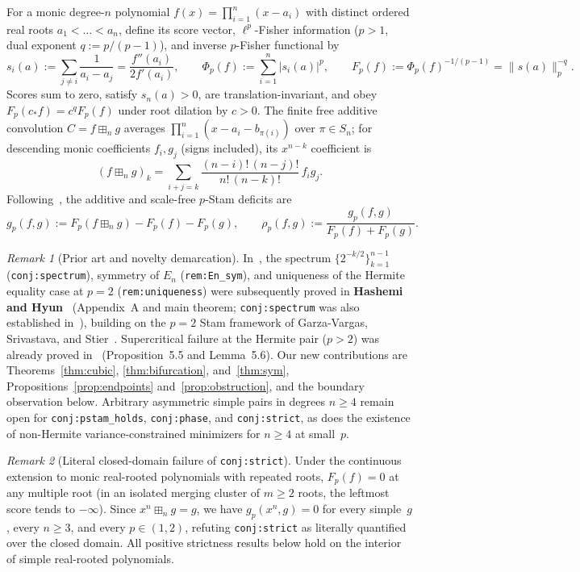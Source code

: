\documentclass[11pt]{article}
\theoremstyle{plain}
\theoremstyle{definition}
\theoremstyle{remark}
\newtheorem{remark}{Remark}
\begin{document}
For a monic degree-$n$ polynomial $f(x) = \prod_{i=1}^n (x - a_i)$ with distinct ordered real roots $a_1 < \dots < a_n$, define its score vector, $\ell^p$-Fisher information ($p > 1$, dual exponent $q := p/(p-1)$), and inverse $p$-Fisher functional by
\[
s_i(a) := \sum_{j \neq i} \frac{1}{a_i - a_j} = \frac{f''(a_i)}{2 f'(a_i)},
\qquad
\Phi_p(f) := \sum_{i=1}^n |s_i(a)|^p,
\qquad
F_p(f) := \Phi_p(f)^{-1/(p-1)} = \|s(a)\|_p^{-q}.
\]
Scores sum to zero, satisfy $s_n(a) > 0$, are translation-invariant, and obey $F_p(c_* f) = c^q F_p(f)$ under root dilation by $c > 0$. The finite free additive convolution $C = f \boxplus_n g$ averages $\prod_{i=1}^n (x - a_i - b_{\pi(i)})$ over $\pi \in S_n$; for descending monic coefficients $f_i, g_j$ (signs included), its $x^{n-k}$ coefficient is
\[
(f \boxplus_n g)_k = \sum_{i+j=k} \frac{(n-i)!\,(n-j)!}{n!\,(n-k)!}\, f_i g_j.
\]
Following~\cite{Hashemi2026}, the additive and scale-free $p$-Stam deficits are
\[
g_p(f,g) := F_p(f \boxplus_n g) - F_p(f) - F_p(g),
\qquad
\rho_p(f,g) := \frac{g_p(f,g)}{F_p(f) + F_p(g)}.
\]

\begin{remark}[Prior art and novelty demarcation]
In~\cite{Hashemi2026}, the spectrum $\{2^{-k/2}\}_{k=1}^{n-1}$ (\texttt{conj:spectrum}), symmetry of $E_n$ (\texttt{rem:En\_sym}), and uniqueness of the Hermite equality case at $p = 2$ (\texttt{rem:uniqueness}) were subsequently proved in \textbf{Hashemi and Hyun}~\cite{HashemiHyun2026} (Appendix~A and main theorem; \texttt{conj:spectrum} was also established in~\cite{MachinaSpec}), building on the $p = 2$ Stam framework of Garza-Vargas, Srivastava, and Stier~\cite{GVS2026}. Supercritical failure at the Hermite pair ($p > 2$) was already proved in~\cite{Hashemi2026} (Proposition~5.5 and Lemma~5.6). Our new contributions are Theorems~\ref{thm:cubic}, \ref{thm:bifurcation}, and~\ref{thm:sym}, Propositions~\ref{prop:endpoints} and~\ref{prop:obstruction}, and the boundary observation below. Arbitrary asymmetric simple pairs in degrees $n \ge 4$ remain open for \texttt{conj:pstam\_holds}, \texttt{conj:phase}, and \texttt{conj:strict}, as does the existence of non-Hermite variance-constrained minimizers for $n \ge 4$ at small~$p$.
\end{remark}

\begin{remark}[Literal closed-domain failure of \texttt{conj:strict}]
Under the continuous extension to monic real-rooted polynomials with repeated roots, $F_p(f) = 0$ at any multiple root (in an isolated merging cluster of $m \ge 2$ roots, the leftmost score tends to $-\infty$). Since $x^n \boxplus_n g = g$, we have $g_p(x^n, g) = 0$ for every simple~$g$, every $n \ge 3$, and every $p \in (1,2)$, refuting \texttt{conj:strict} as literally quantified over the closed domain. All positive strictness results below hold on the interior of simple real-rooted polynomials.
\end{remark}
\end{document}
